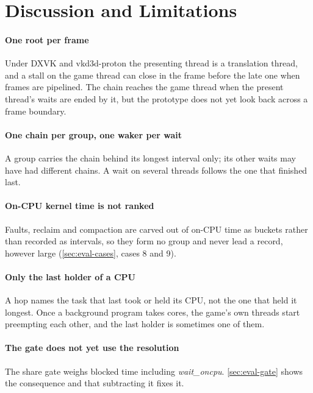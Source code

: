 \section{Discussion and Limitations}
\label{sec:limitations}

\paragraph{One root per frame} Under DXVK and vkd3d-proton the presenting thread
is a translation thread, and a stall on the game thread can close in the
frame before the late one when frames are pipelined. The chain reaches the
game thread when the present thread's waits are ended by it, but the
prototype does not yet look back across a frame boundary.

\paragraph{One chain per group, one waker per wait} A group carries the chain
behind its longest interval only; its other waits may have had different
chains. A wait on several threads follows the one that finished last.

\paragraph{On-CPU kernel time is not ranked} Faults, reclaim and compaction are
carved out of on-CPU time as buckets rather than recorded as intervals, so
they form no group and never lead a record, however large
(\autoref{sec:eval-cases}, cases 8 and 9).

\paragraph{Only the last holder of a CPU} A hop names the task that last took
or held its CPU, not the one that held it longest. Once a background
program takes cores, the game's own threads start preempting each other,
and the last holder is sometimes one of them.

\paragraph{The gate does not yet use the resolution} The share gate weighs
blocked time including \textit{wait\_oncpu}. \autoref{sec:eval-gate}
shows the consequence and that subtracting it fixes it.

